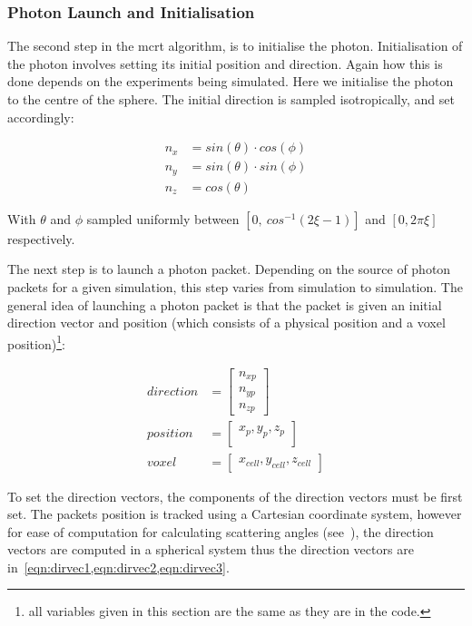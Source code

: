 \subsubsection*{Photon Launch and Initialisation}\label{sec:photlaunch}

The second step in the \gls*{mcrt} algorithm, is to initialise the photon. Initialisation of the photon involves setting its initial position and direction. Again how this is done depends on the experiments being simulated. Here we initialise the photon to the centre of the sphere. The initial direction is sampled isotropically, and set accordingly:

\begin{align}
n_{x}&=sin(\theta) \cdot cos(\phi) \label{eqn:dirvec1}\\
n_{y}&=sin(\theta) \cdot sin(\phi) \label{eqn:dirvec2}\\
n_{z}&=cos(\theta) \label{eqn:dirvec3}
\end{align}


With $\theta$ and $\phi$ sampled uniformly between $[0,\ cos^{-1}(2\xi-1)]$ and $[0,2\pi\xi]$ respectively.

The next step is to launch a photon packet. 
Depending on the source of photon packets for a given simulation, this step varies from simulation to simulation. 
The general idea of launching a photon packet is that the packet is given an initial direction vector and position (which consists of a physical position and a voxel position)\footnote{all variables given in this section are the same as they are in the code.}:

\begin{align}
	direction &= \begin{bmatrix}
		n_{xp}\\
		n_{yp}\\
		n_{zp}
	\end{bmatrix}\\
	position &= \begin{bmatrix}
		x_p, y_p, z_p\\
	\end{bmatrix}\\
	voxel &= \begin{bmatrix}
		x_{cell}, y_{cell}, z_{cell}
	\end{bmatrix}	 
\end{align}

To set the direction vectors, the components of the direction vectors must be first set. The packets position is tracked using a Cartesian coordinate system, however for ease of computation for calculating scattering angles (see~), the direction vectors are computed in a spherical system thus the direction vectors are in~\cref{eqn:dirvec1,eqn:dirvec2,eqn:dirvec3}. 

